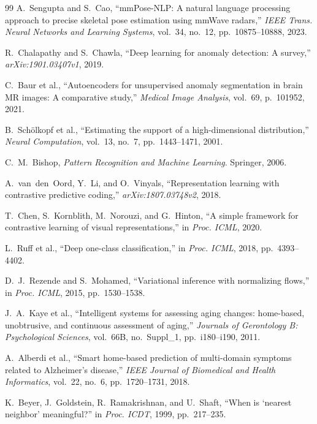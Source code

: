 \documentclass[11pt,a4paper]{article}
\begin{document}
\begin{thebibliography}{99}
A.~Sengupta and S.~Cao, ``mmPose-NLP: A natural language processing approach to precise skeletal pose estimation using mmWave radars,'' \emph{IEEE Trans. Neural Networks and Learning Systems}, vol.~34, no.~12, pp.~10875--10888, 2023.

R.~Chalapathy and S.~Chawla, ``Deep learning for anomaly detection: A survey,'' \emph{arXiv:1901.03407v1}, 2019.

C.~Baur et al., ``Autoencoders for unsupervised anomaly segmentation in brain MR images: A comparative study,'' \emph{Medical Image Analysis}, vol.~69, p.~101952, 2021.

B.~Sch\"{o}lkopf et al., ``Estimating the support of a high-dimensional distribution,'' \emph{Neural Computation}, vol.~13, no.~7, pp.~1443--1471, 2001.

C.~M.~Bishop, \emph{Pattern Recognition and Machine Learning}. Springer, 2006.

A.~van~den~Oord, Y.~Li, and O.~Vinyals, ``Representation learning with contrastive predictive coding,'' \emph{arXiv:1807.03748v2}, 2018.

T.~Chen, S.~Kornblith, M.~Norouzi, and G.~Hinton, ``A simple framework for contrastive learning of visual representations,'' in \emph{Proc. ICML}, 2020.

L.~Ruff et al., ``Deep one-class classification,'' in \emph{Proc. ICML}, 2018, pp.~4393--4402.

D.~J.~Rezende and S.~Mohamed, ``Variational inference with normalizing flows,'' in \emph{Proc. ICML}, 2015, pp.~1530--1538.

J.~A.~Kaye et al., ``Intelligent systems for assessing aging changes: home-based, unobtrusive, and continuous assessment of aging,'' \emph{Journals of Gerontology B: Psychological Sciences}, vol.~66B, no.~Suppl\_1, pp.~i180--i190, 2011.

A.~Alberdi et al., ``Smart home-based prediction of multi-domain symptoms related to Alzheimer's disease,'' \emph{IEEE Journal of Biomedical and Health Informatics}, vol.~22, no.~6, pp.~1720--1731, 2018.

K.~Beyer, J.~Goldstein, R.~Ramakrishnan, and U.~Shaft, ``When is `nearest neighbor' meaningful?'' in \emph{Proc. ICDT}, 1999, pp.~217--235.

\end{thebibliography}
\end{document}
